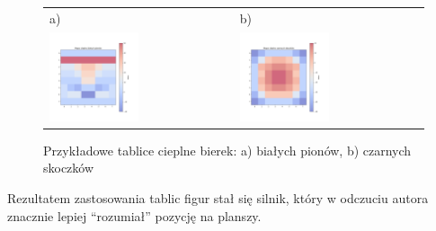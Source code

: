 \begin{figure}[ht]
    \centering
    \begin{tabular}{@{}ll@{}}
        a) & b) \\
        \includegraphics[width=0.5\textwidth]{rozdzialy/rozdzial02/2_ulepszenia_oceny/rysunki/bialePiony}
        &
        \includegraphics[width=0.5\textwidth]{rozdzialy/rozdzial02/2_ulepszenia_oceny/rysunki/czarneSkoczki}
    \end{tabular}
    \caption{Przykładowe tablice cieplne bierek: a) białych pionów, b) czarnych skoczków}
    \label{fig: tablice-figur}
\end{figure}

Rezultatem zastosowania tablic figur stał się silnik, który w odczuciu autora znacznie lepiej \enquote{rozumiał} pozycję na planszy.